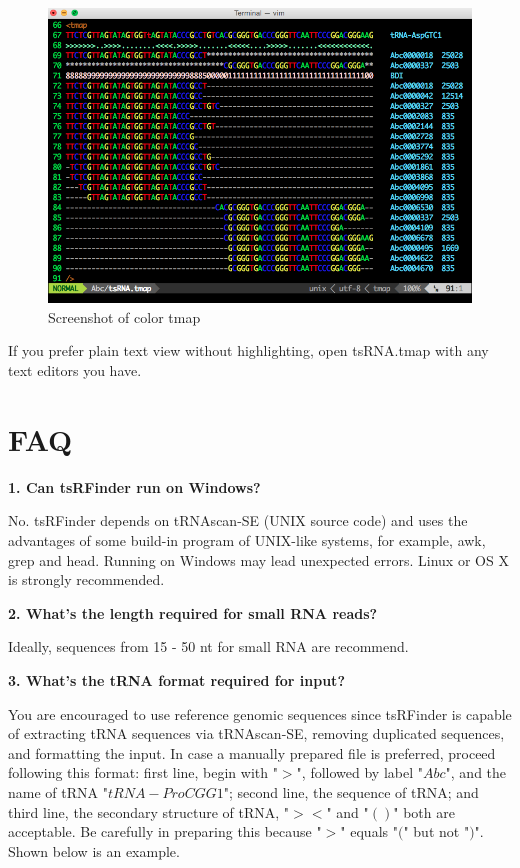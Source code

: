 \documentclass[11pt, a4paper]{article}
\begin{document}
\begin{figure}[htbp]
\begin{center}
\includegraphics[width=12cm]{tmap.png}
\caption{Screenshot of color tmap} 
\label{tmap}
\end{center}
\end{figure}

If you prefer plain text view without highlighting, open tsRNA.tmap with any text editors you have.

\section{FAQ}

\textbf{1. Can tsRFinder run on Windows?}

No. tsRFinder depends on tRNAscan-SE (UNIX source code) and uses the advantages of some build-in program of UNIX-like systems, for example, awk, grep and head. Running on Windows may lead unexpected errors. Linux or OS X is strongly recommended.

\textbf{2. What's the length required for small RNA reads?}

Ideally, sequences from 15 - 50 nt for small RNA are recommend.

\textbf{3. What's the tRNA format required for input?}

You are encouraged to use reference genomic sequences since tsRFinder is capable of extracting tRNA sequences via tRNAscan-SE, removing duplicated sequences, and formatting the input. In case a manually prepared file is preferred, proceed following this format: first line, begin with "$>$", followed by label "$Abc$", and the name of tRNA "$tRNA-ProCGG1$"; second line, the sequence of tRNA; and third line, the secondary structure of tRNA, "$><$" and "$()$" both are acceptable. Be carefully in preparing this because "$>$" equals "$($" but not "$)$".\\
Shown below is an example.
\end{document}
